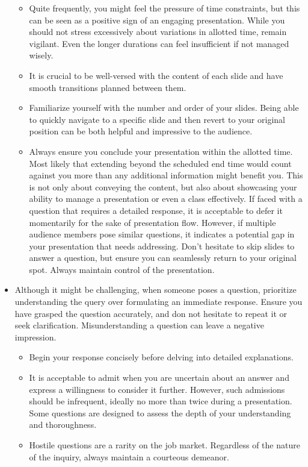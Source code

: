 \documentclass[12pt]{article}
\begin{document}
\begin{itemize}
\begin{itemize}
\item Quite frequently, you might feel the pressure of time constraints, but this can be seen as a positive sign of an engaging presentation. While you should not stress excessively about variations in allotted time, remain vigilant. Even the longer durations can feel insufficient if not managed wisely.
\item It is crucial to be well-versed with the content of each slide and have smooth transitions planned between them.
\item Familiarize yourself with the number and order of your slides. Being able to quickly navigate to a specific slide and then revert to your original position can be both helpful and impressive to the audience.
\item Always ensure you conclude your presentation within the allotted time. Most likely that extending beyond the scheduled end time would count against you more than any additional information might benefit you. This is not only about conveying the content, but also about showcasing your ability to manage a presentation or even a class effectively. If faced with a question that requires a detailed response, it is acceptable to defer it momentarily for the sake of presentation flow. However, if multiple audience members pose similar questions, it indicates a potential gap in your presentation that needs addressing. Don't hesitate to skip slides to answer a question, but ensure you can seamlessly return to your original spot. Always maintain control of the presentation.
\end{itemize}
\item Although it might be challenging, when someone poses a question, prioritize understanding the query over formulating an immediate response. Ensure you have grasped the question accurately, and don not hesitate to repeat it or seek clarification. Misunderstanding a question can leave a negative impression.
\begin{itemize}
\item Begin your response concisely before delving into detailed explanations.
\item It is acceptable to admit when you are uncertain about an answer and express a willingness to consider it further. However, such admissions should be infrequent, ideally no more than twice during a presentation. Some questions are designed to assess the depth of your understanding and thoroughness.
\item Hostile questions are a rarity on the job market. Regardless of the nature of the inquiry, always maintain a courteous demeanor.

\end{itemize}
\end{itemize}
\end{document}
